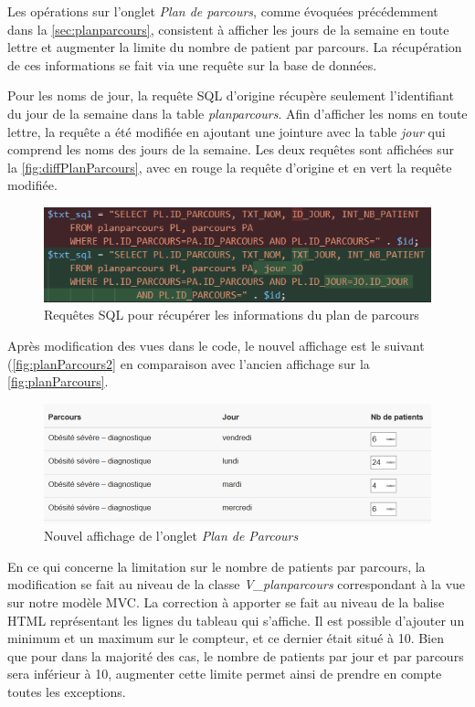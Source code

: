 \documentclass[noposter]{polytech/polytech}
\begin{document}
Les opérations sur l'onglet \textit{Plan de parcours}, comme évoquées précédemment dans la \autoref{sec:planparcours}, consistent à afficher les jours de la semaine en toute lettre et augmenter la limite du nombre de patient par parcours. La récupération de ces informations se fait via une requête sur la base de données. 

Pour les noms de jour, la requête SQL d'origine récupère seulement l'identifiant du jour de la semaine dans la table \textit{planparcours}. Afin d'afficher les noms en toute lettre, la requête a été modifiée en ajoutant une jointure avec la table \textit{jour} qui comprend les noms des jours de la semaine. Les deux requêtes sont affichées sur la \autoref{fig:diffPlanParcours}, avec en rouge la requête d'origine et en vert la requête modifiée. 

\begin{figure}
	\includegraphics[scale=1]{images/diffPlanParcours}
	\caption{Requêtes SQL pour récupérer les informations du plan de parcours}
	\label{fig:diffPlanParcours}
\end{figure}

Après modification des vues dans le code, le nouvel affichage est le suivant (\autoref{fig:planParcours2} en comparaison avec l'ancien affichage sur la \autoref{fig:planParcours}.

\begin{figure}
	\includegraphics[scale=0.5]{images/planParcours2}
	\caption{Nouvel affichage de l'onglet \textit{Plan de Parcours}}
	\label{fig:planParcours2}
\end{figure}

En ce qui concerne la limitation sur le nombre de patients par parcours, la modification se fait au niveau de la classe \textit{V\_planparcours} correspondant à la vue sur notre modèle MVC. La correction à apporter se fait au niveau de la balise HTML  représentant les lignes du tableau qui s'affiche. Il est possible d'ajouter un minimum et un maximum sur le compteur, et ce dernier était situé à 10. Bien que pour dans la majorité des cas, le nombre de patients par jour et par parcours sera inférieur à 10, augmenter cette limite permet ainsi de prendre en compte toutes les exceptions.
\end{document}

